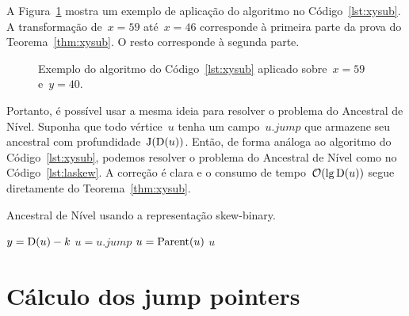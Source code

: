 \documentclass[main.tex]{subfiles}
\begin{document}
A Figura~\ref{fig:exxysub} mostra um exemplo de aplicação do algoritmo no Código~\ref{lst:xysub}. A transformação de~$x = 59$ até~$x = 46$ corresponde à primeira parte da prova do Teorema~\ref{thm:xysub}. O resto corresponde à segunda parte.

\begin{figure}[H]
\caption{Exemplo do algoritmo do Código~\ref{lst:xysub} aplicado sobre~$x = 59$ e~$y = 40$.} \label{fig:exxysub}
\end{figure}

\newcommand{\jmp}{\mathit{jump}}
Portanto, é possível usar a mesma ideia para resolver o problema do Ancestral de Nível. Suponha que todo vértice~$u$ tenha um campo~$u.\jmp$ que armazene seu ancestral com profundidade~$\operatorname{J}(\operatorname{D}(u))$. Então, de forma análoga ao algoritmo do Código~\ref{lst:xysub}, podemos resolver o problema do Ancestral de Nível como no Código~\ref{lst:laskew}. A correção é clara e o consumo de tempo~$\mathcal{O}(\lg\operatorname{D}(u))$ segue diretamente do Teorema~\ref{thm:xysub}.

\begin{algorithm}
\caption{Ancestral de Nível usando a representação skew-binary.} \label{lst:laskew}
\begin{algorithmic}[1]
		\State $y = \operatorname{D}(u) - k$
			\If{$\Dep(u.\jmp) \geq y$}
				\State $u = u.\jmp$
			\Else
				\State $u = \operatorname{Parent}(u)$
			\EndIf
		\EndWhile
		\State \Return $u$
	\EndFunction
\end{algorithmic}
\end{algorithm}

\section{Cálculo dos jump pointers}
\end{document}
